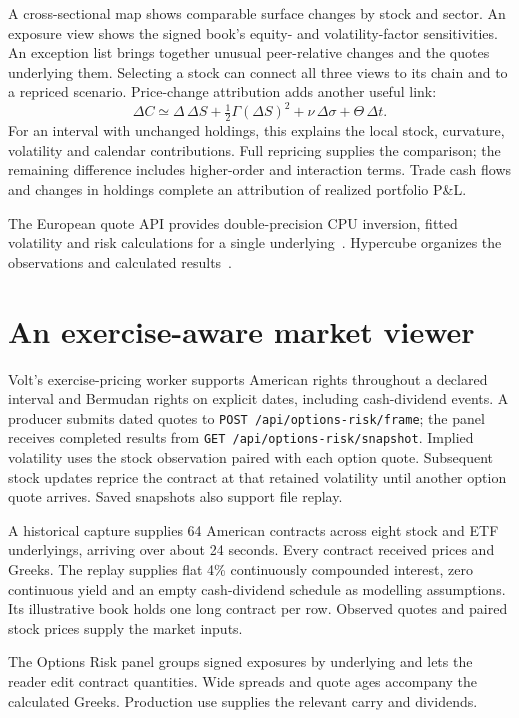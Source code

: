 \documentclass[8pt]{strategynet-journal}
\begin{document}
\begin{SNcolumns}
A cross-sectional map
shows comparable surface changes by stock and sector. An exposure view shows
the signed book's equity- and volatility-factor sensitivities. An exception
list brings together unusual peer-relative changes and the quotes underlying
them. Selecting a stock can connect all three views to its chain and to a
repriced scenario. Price-change attribution adds another useful link:
\[
 \Delta C\simeq\Delta\,\Delta S+
 \tfrac12\Gamma(\Delta S)^2+\nu\,\Delta\sigma+\Theta\,\Delta t.
\]
For an interval with unchanged holdings, this explains the local stock,
curvature, volatility and calendar contributions. Full repricing supplies the
comparison; the remaining difference includes higher-order and interaction
terms. Trade cash flows and changes in holdings complete an attribution of
realized portfolio P\&L.

The European quote API provides double-precision CPU inversion, fitted
volatility and risk calculations for a single underlying~\cite{volt}. Hypercube organizes the
observations and calculated results~\cite{hypercube}. \section{An exercise-aware market viewer}
Volt's exercise-pricing worker supports American rights throughout a declared
interval and Bermudan rights on explicit dates, including cash-dividend
events. A producer submits dated quotes to
\texttt{POST /api/options-risk/frame}; the panel receives completed results
from \texttt{GET /api/options-risk/snapshot}. Implied volatility uses the stock
observation paired with each option quote. Subsequent stock updates reprice
the contract at that retained volatility until another option quote arrives.
Saved snapshots also support file replay.

A historical capture supplies 64 American contracts across eight stock and
ETF underlyings, arriving over about 24 seconds. Every contract received prices
and Greeks. The replay supplies flat 4\% continuously compounded interest,
zero continuous yield and an empty cash-dividend schedule as modelling
assumptions. Its illustrative book holds one long contract per row.
Observed quotes and paired stock prices supply the market inputs.

The Options Risk panel groups signed exposures by underlying and lets the
reader edit contract quantities. Wide spreads and quote ages accompany the
calculated Greeks. Production use supplies the relevant carry and dividends.

\end{SNcolumns}
\end{document}
